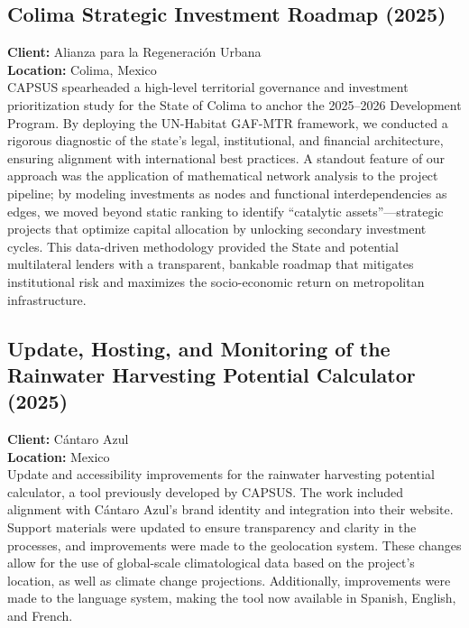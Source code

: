 \documentclass[
	a4paper,
	12pt,
	unnumberedsections,
]{CSSullivanBusinessReport}
\begin{document}
\subsection{Colima Strategic Investment Roadmap (2025)}
\textbf{Client:}  Alianza para la Regeneración Urbana \\
\textbf{Location:}  Colima, Mexico \\[0.5em]
 CAPSUS spearheaded a high-level territorial governance and investment prioritization study for the State of Colima to anchor the 2025–2026 Development Program. By deploying the UN-Habitat GAF-MTR framework, we conducted a rigorous diagnostic of the state’s legal, institutional, and financial architecture, ensuring alignment with international best practices. A standout feature of our approach was the application of mathematical network analysis to the project pipeline; by modeling investments as nodes and functional interdependencies as edges, we moved beyond static ranking to identify “catalytic assets”—strategic projects that optimize capital allocation by unlocking secondary investment cycles. This data-driven methodology provided the State and potential multilateral lenders with a transparent, bankable roadmap that mitigates institutional risk and maximizes the socio-economic return on metropolitan infrastructure.

\subsection{Update, Hosting, and Monitoring of the Rainwater Harvesting Potential Calculator (2025)}
\textbf{Client:}  Cántaro Azul  \\
\textbf{Location:}  Mexico  \\[0.5em]
 Update and accessibility improvements for the rainwater harvesting potential calculator, a tool previously developed by CAPSUS. The work included alignment with Cántaro Azul’s brand identity and integration into their website. Support materials were updated to ensure transparency and clarity in the processes, and improvements were made to the geolocation system. These changes allow for the use of global-scale climatological data based on the project's location, as well as climate change projections. Additionally, improvements were made to the language system, making the tool now available in Spanish, English, and French.
\end{document}
